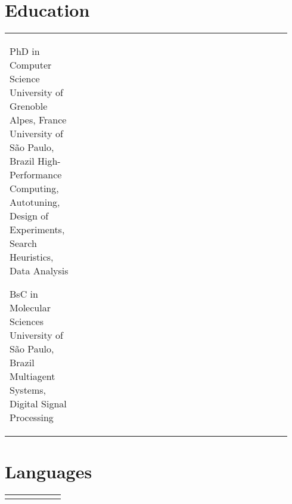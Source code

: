\documentclass[a4paper,10pt]{article}
\begin{document}
\begin{paracol}{2}
\smallskip %

\section{Education}
\label{sec:org7adace8}
\begin{supertabular}{R{0.24\linewidth}L{0.7\linewidth}}
    {PhD in Computer Science}
    {University of Grenoble Alpes, France}
    {University of São Paulo, Brazil}
    {High-Performance Computing, Autotuning, Design of Experiments, Search
    Heuristics, Data Analysis}

    {BsC in Molecular Sciences}
    {}
    {University of São Paulo, Brazil}
    {Multiagent Systems, Digital Signal Processing}

\end{supertabular}

\section{Languages}
\label{sec:org733e4aa}
\begin{center}
\begin{supertabular}{R{0.3\linewidth}C{0.17\linewidth}L{0.3\linewidth}}
\end{supertabular}
\end{center}
\end{paracol}
\smallskip
\end{document}

